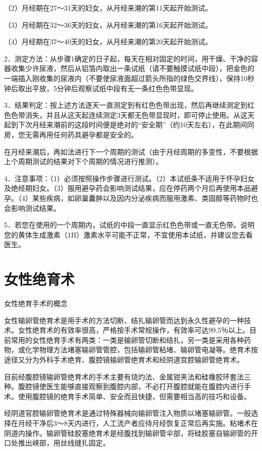 \documentclass[12pt,UTF8,openany]{ctexbook}
\begin{document}
（2）月经期在27～31天的妇女，从月经来潮的第11天起开始测试。

（3）月经期在32～36天的妇女，从月经来潮的第16天起开始测试。

（4）月经期在37～40天的妇女，从月经来潮的第20天起开始测试。

2．测定方法：从步骤1确定的日子起，每天在相对固定的时间，用干燥、干净的容器收集少许尿液，然后从铝箔内取出一条试纸（请不要触摸试纸中段），把金色的一端插入刚收集的尿液内（不要使尿液面超过箭头所指的绿色交界线），保持10秒钟后取出平放，5分钟后观察试纸中段有无一条红色色带显现。

3．结果判定：按上述方法逐天一直测定到有红色色带出现，然后再继续测定到红色色带消失，并且从这天起连续测定3天都无色带显现时，即可停止使用。从这天起到下次月经来潮前的这段时间便是绝对的“安全期”（约10天左右），在此期间同房，您无需再用任何药具避孕都是安全的。

在月经来潮后，再如法进行下一个周期的测试（由于月经周期的多变性，不要根据上个周期测试的结果对下个周期的情况进行推测）。

4．注意事项：（1）必须按照操作步骤进行测试。（2）本试纸条不适用于怀孕妇女及绝经期妇女。（3）服用避孕药会影响测试结果，应在停药两个月后再使用本品避孕。（4）某些疾病，如卵巢囊肿以及因内分泌疾病而服用激素、类固醇等药物时也会影响测试结果。

5．若您在使用的一个周期内，试纸的中段一直显示红色色带或一直无色带。说明您的黄体生成激素（1H）激素水平可能不正常，不宜使用本试纸，并建议您去看医生。





\chapter{女性绝育术}


女性绝育手术的概念


女性输卵管绝育术是用手术的方法切断、结扎输卵管而达到永久性避孕的一种技术。女性绝育术的有效率很高，严格按手术常规操作，有效率可达99.5％以上。目前常用的女性绝育手术有两类：一类是输卵管切断和结扎，另一类是采用各种药物，或化学物理方法堵塞输卵管管腔，包括输卵管粘堵、输卵管电凝等。绝育术按途径又分为外科手术绝育、腹腔镜输卵管绝育术和经阴道宫腔输卵管绝育术。

目前经腹腔镜输卵管绝育术的手术主要有烧灼法、金属钳夹法和硅橡胶环套法三种。腹腔镜使医生能够直接观察到腹腔内部，不必打开腹腔就能在腹腔内进行手术。使用腹腔镜的绝育手术简单、安全而且快捷，但需要相当高的技巧和设备。

经阴道官腔输卵管绝育术是通过特殊器械向输卵管注入物质以堵塞输卵管。一般选择在月经干净后3～8天内进行，人工流产者应待月经恢复正常后再实施。粘堵术在阴道内操作。输卵管硅胶塞绝育术是经腹找到输卵管伞部，将硅胶塞自输卵管的开口处推出峡部，用丝线缝扎固定。
\end{document}
